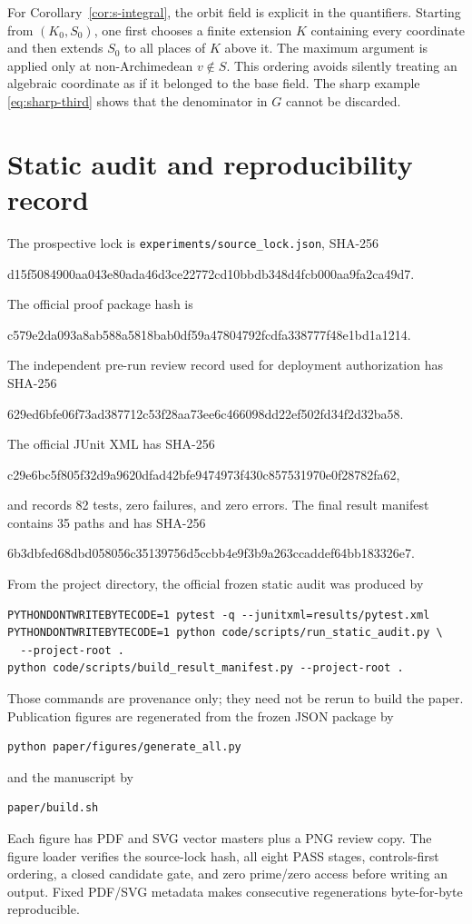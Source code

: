 \documentclass[11pt]{article}
\theoremstyle{definition}
\theoremstyle{remark}
\begin{document}
For Corollary~\ref{cor:s-integral}, the orbit field is explicit in the
quantifiers.  Starting from $(K_0,S_0)$, one first chooses a finite extension
$K$ containing every coordinate and then extends $S_0$ to all places of $K$
above it.  The maximum argument is applied only at non-Archimedean
$v\notin S$.  This ordering avoids silently treating an algebraic coordinate
as if it belonged to the base field.  The sharp example
\eqref{eq:sharp-third} shows that the denominator in $G$ cannot be discarded.

\section{Static audit and reproducibility record}
\label{app:reproducibility}

The prospective lock is
\texttt{experiments/source\_lock.json}, SHA-256
\begin{center}
\small\ttfamily
d15f5084900aa043e80ada46d3ce22772cd10bbdb348d4fcb000aa9fa2ca49d7.
\end{center}
The official proof package hash is
\begin{center}
\small\ttfamily
c579e2da093a8ab588a5818bab0df59a47804792fcdfa338777f48e1bd1a1214.
\end{center}
The independent pre-run review record used for deployment authorization has
SHA-256
\begin{center}
\small\ttfamily
629ed6bfe06f73ad387712c53f28aa73ee6c466098dd22ef502fd34f2d32ba58.
\end{center}
The official JUnit XML has SHA-256
\begin{center}
\small\ttfamily
c29e6bc5f805f32d9a9620dfad42bfe9474973f430c857531970e0f28782fa62,
\end{center}
and records 82 tests, zero failures, and zero errors.  The final result
manifest contains 35 paths and has SHA-256
\begin{center}
\small\ttfamily
6b3dbfed68dbd058056c35139756d5ccbb4e9f3b9a263ccaddef64bb183326e7.
\end{center}

From the project directory, the official frozen static audit was produced by
\begin{verbatim}
PYTHONDONTWRITEBYTECODE=1 pytest -q --junitxml=results/pytest.xml
PYTHONDONTWRITEBYTECODE=1 python code/scripts/run_static_audit.py \
  --project-root .
python code/scripts/build_result_manifest.py --project-root .
\end{verbatim}
Those commands are provenance only; they need not be rerun to build the paper.
Publication figures are regenerated from the frozen JSON package by
\begin{verbatim}
python paper/figures/generate_all.py
\end{verbatim}
and the manuscript by
\begin{verbatim}
paper/build.sh
\end{verbatim}
Each figure has PDF and SVG vector masters plus a PNG review copy.  The figure
loader verifies the source-lock hash, all eight PASS stages, controls-first
ordering, a closed candidate gate, and zero prime/zero access before writing
an output.  Fixed PDF/SVG metadata makes consecutive regenerations
byte-for-byte reproducible.
\end{document}
